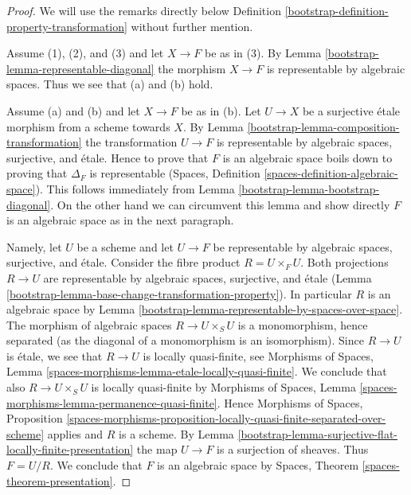 \begin{proof}

We will use the remarks directly below
Definition \ref{bootstrap-definition-property-transformation}
without further mention.

\medskip\noindent
Assume (1), (2), and (3) and let $X \to F$ be as in (3).
By Lemma \ref{bootstrap-lemma-representable-diagonal} the morphism
$X \to F$ is representable by algebraic spaces. Thus
we see that (a) and (b) hold.

\medskip\noindent
Assume (a) and (b) and let $X \to F$ be as in (b).
Let $U \to X$ be a surjective \'etale morphism from a scheme towards $X$.
By Lemma \ref{bootstrap-lemma-composition-transformation} the transformation
$U \to F$ is representable by algebraic spaces, surjective, and \'etale.
Hence to prove that $F$ is an algebraic space boils down to proving that
$\Delta_F$ is representable (Spaces, Definition
\ref{spaces-definition-algebraic-space}). This follows immediately from
Lemma \ref{bootstrap-lemma-bootstrap-diagonal}.
On the other hand we can circumvent this lemma and show directly $F$
is an algebraic space as in the next paragraph.

\medskip\noindent
Namely, let $U$ be a scheme and let $U \to F$ be representable by algebraic
spaces, surjective, and \'etale. Consider the fibre product $R = U \times_F U$.
Both projections $R \to U$ are representable by algebraic spaces, surjective,
and \'etale (Lemma \ref{bootstrap-lemma-base-change-transformation-property}).
In particular $R$ is an algebraic space by
Lemma \ref{bootstrap-lemma-representable-by-spaces-over-space}.
The morphism of algebraic spaces $R \to U \times_S U$ is a monomorphism,
hence separated (as the diagonal of a monomorphism is an isomorphism).
Since $R \to U$ is \'etale, we see that $R \to U$ is locally quasi-finite, see
Morphisms of Spaces,
Lemma \ref{spaces-morphisms-lemma-etale-locally-quasi-finite}.
We conclude that also $R \to U \times_S U$ is
locally quasi-finite by
Morphisms of Spaces,
Lemma \ref{spaces-morphisms-lemma-permanence-quasi-finite}.
Hence
Morphisms of Spaces, Proposition
\ref{spaces-morphisms-proposition-locally-quasi-finite-separated-over-scheme}
applies and $R$ is a scheme. By
Lemma \ref{bootstrap-lemma-surjective-flat-locally-finite-presentation}
the map $U \to F$ is a surjection of sheaves. Thus $F = U/R$.
We conclude that $F$ is an algebraic space by
Spaces, Theorem \ref{spaces-theorem-presentation}.
\end{proof}

